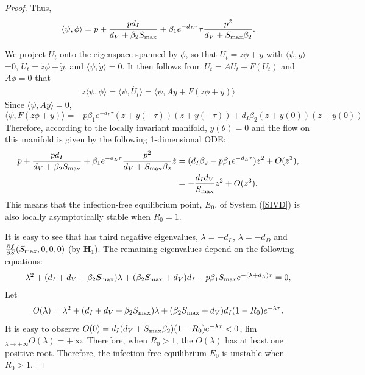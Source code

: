 \documentclass{CMHPhD-SIVD}
\begin{document}
\begin{proof}
Thus,
\begin{align*}
\langle \psi,\phi \rangle =p+\frac{p d_I}{d_V+\beta_2 S_{\text{max}}}+\beta_1 e^{-d_L \tau} \tau \frac{p^2}{d_V+S_{\text{max}}\beta_2}.
\end{align*}

We project $U_t$ onto the eigenspace spanned by $\phi$, so that $U_t = z\phi + y$ with $\langle \psi,y \rangle$=0, $\dot{U_t}= \dot{z}\phi +\dot{ y}$,  and $\langle \psi, \dot{y}\rangle = 0$. It then follows from $U_t = AU_t + F(U_t)$ and $A\phi =0$ that
\begin{align*}
\dot{z}\langle \psi,\phi \rangle=\langle \psi,\dot{U_t}\rangle=\langle \psi,Ay+F(z\phi + y)\rangle
\end{align*}
Since $\langle \psi,Ay\rangle=0$, 
\begin{equation}\label{32}
\langle \psi,F(z\phi + y)\rangle=-p\beta_1e^{-d_L \tau}(z+y(-\tau))(z+y(-\tau))+d_I\beta_2(z+y(0))(z+y(0))
\end{equation}
Therefore, according to the locally invariant manifold, $y(\theta)=0$ and the flow on this manifold is given by the following 1-dimensional ODE:
\begin{align}\label{33}
p+\frac{p d_I}{d_V+\beta_2 S_{\text{max}}}+\beta_1 e^{-d_L \tau} \frac{p^2}{d_V+S_{\text{max}}\beta_2}\dot{z}&=(d_I\beta_2-p\beta_1e^{-d_L \tau})z^2+O(z^3),\nonumber \\
&=-\frac{d_I d_V}{S_{\text{max}}}z^2+O(z^3).
\end{align}
This means that the infection-free equilibrium point, $E_0$, of System (\ref{SIVD}) is also locally asymptotically stable when $R_0=1$.

It is easy to see that  has third negative eigenvalues, $\lambda=-d_L$, $\lambda=-d_D$ and $\frac{\partial f }{\partial S}(S_{\text{max}}, 0, 0, 0)$ (by $\mathbf{H}_1$).
The remaining eigenvalues depend on the following equations:
\begin{equation}\label{5}
   \begin{array}{ll}
    \lambda^2+(d_I+d_V+\beta_2 S_{\text{max}})\lambda+(\beta_2 S_{\text{max}}+d_V)d_I-p\beta_1 S_{\text{max}} e^{-(\lambda+d_L)\tau}=0,
   \end{array}
\end{equation}
Let
\begin{equation}\label{15}
   \begin{array}{ll}
    O(\lambda)=\lambda^2+(d_I+d_V+\beta_2 S_{\text{max}})\lambda+(\beta_2 S_{\text{max}}+d_V)d_I(1-R_0)e^{-\lambda \tau}.
   \end{array}
\end{equation}
It is easy to observe $O(0)=d_{I}(d_{V}+S_{\text{max}} \beta_2)(1-R_0)e^{-\lambda \tau}<0$, lim$_{\lambda\rightarrow+\infty}O(\lambda)=+\infty$. Therefore, when $R_0>1$, the $O(\lambda)$ has at least one positive root. Therefore, the infection-free equilibrium $E_0$ is unstable when $R_0>1$.


\end{proof}
\end{document}
